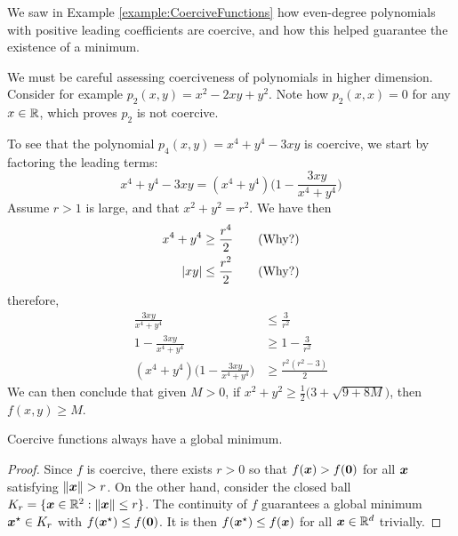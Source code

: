 \begin{example}\label{example:CoerciveFunctionsGeneral}
We saw in Example \ref{example:CoerciveFunctions} how even-degree polynomials with positive leading coefficients are coercive, and how this helped guarantee the existence of a minimum.

We must be careful assessing coerciveness of polynomials in higher dimension. Consider for example $p_2(x,y) = x^2 - 2xy + y^2$.  Note how $p_2(x,x)=0$ for any $x \in \mathbb{R}$, which proves $p_2$ is not coercive.

To see that the polynomial $p_4(x, y) = x^4 + y^4 - 3xy$ is coercive, we start by factoring the leading terms:
\begin{equation*}
x^4 + y^4 - 3xy = (x^4 + y^4) \bigg( 1 - \frac{3xy}{x^4 + y^4} \bigg)
\end{equation*}
Assume $r>1$ is large, and that $x^2+y^2 = r^2$.  We have then
\begin{align*}
x^4 + y^4 &\geq \frac{r^4}{2} \qquad\text{(Why?)} \\
 \lvert x y \rvert &\leq \frac{r^2}{2} \qquad\text{(Why?)}
\end{align*}
therefore, 
\begin{align*}
\frac{3xy}{x^4 + y^4} &\leq \frac{3}{r^2} \\
1 - \frac{3xy}{x^4 + y^4} &\geq 1 - \frac{3}{r^2} \\
(x^4 + y^4) \bigg( 1 - \frac{3x y}{x^4 + y^4} \bigg) &\geq \frac{r^2(r^2-3)}{2}
\end{align*} 
We can then conclude that given $M>0$, if $x^2+y^2 \geq \tfrac{1}{2} \big( 3+\sqrt{9+8M} \big)$, then $f(x,y) \geq M$.
\end{example}

\begin{theorem}\label{theorem:CoerciveFunctions}
Coercive functions always have a global minimum.
\end{theorem}
\begin{proof}
Since $f$ is coercive, there exists $r>0$ so that $f(\boldsymbol{x}) > f(\boldsymbol{0})$ for all $\boldsymbol{x}$ satisfying $\lVert \boldsymbol{x} \rVert>r$.  On the other hand, consider the closed ball $K_r = \{ \boldsymbol{x} \in \mathbb{R}^2 : \lVert \boldsymbol{x} \rVert \leq r \}$.  The continuity of $f$ guarantees a global minimum $\boldsymbol{x}^{\star} \in K_r$ with $f(\boldsymbol{x}^{\star}) \leq f(\boldsymbol{0})$.  It is then $f(\boldsymbol{x}^{\star}) \leq f(\boldsymbol{x})$ for all $\boldsymbol{x} \in \mathbb{R}^d$ trivially.
\end{proof}

